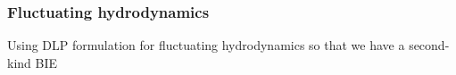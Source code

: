 \subsubsection{Fluctuating hydrodynamics}
Using DLP formulation for fluctuating hydrodynamics so that we have a
second-kind BIE




 
